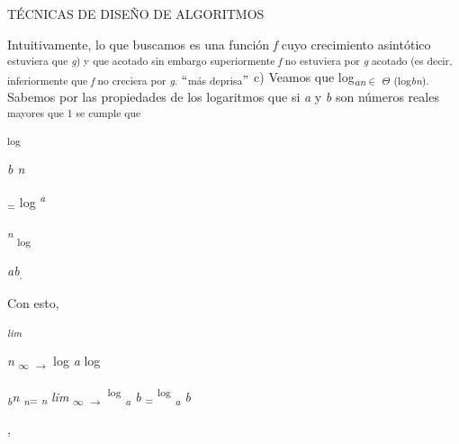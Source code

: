 \documentclass[12pt]{article}
\renewcommand{\_}{\kern-1.5pt\textunderscore\kern-1.5pt}
\begin{document}
{\fontsize{10pt}{12.0pt} {\fontsize{7pt}{8.4pt}\selectfont TÉCNICAS DE DISEÑO DE ALGORITMOS \par}\par}\par

\begin{justify}
{\fontsize{10pt}{12.0pt}\selectfont Intuitivamente, lo que buscamos es una función \textit{f }cuyo crecimiento asintótico \textsubscript{estuviera que \textit{g}) y que acotado sin embargo superiormente \textit{f }no estuviera por \textit{g }acotado (es decir, inferiormente que \textit{f }no creciera por \textit{g}. $``$más deprisa$"$  }c) Veamos que log\textit{\textsubscript{an}}\textsubscript{$ \in $ $ \Theta $ (log\textit{bn}). }Sabemos por las propiedades de los logaritmos que si \textit{a }y \textit{b }son números reales \textsubscript{mayores que 1 se cumple que }\par}
\end{justify}\par

\textsubscript{log }{\fontsize{6pt}{7.2pt}\selectfont \textit{b n }\par}\par

\textsubscript{= }log \textit{\textsuperscript{a }}\par

\textit{\textsuperscript{n }}\textsubscript{log }\par

{\fontsize{6pt}{7.2pt}\selectfont \textit{ab}\textsubscript{. }\par}\par

{\fontsize{10pt}{12.0pt}\selectfont Con esto, \par}\par

\textit{\textsubscript{lim }}{\fontsize{6pt}{7.2pt}\selectfont \textit{n }\textsubscript{$\infty$ $ \rightarrow $  }log \textit{a }log \par}\par

\textit{\textsubscript{b}n \textsubscript{n}}\textsubscript{= \textit{n }}\textit{lim }\textsubscript{$\infty$ $ \rightarrow $  }\textsuperscript{log }\textit{\textsubscript{a }b }\textsubscript{= }\textsuperscript{log }\textit{\textsubscript{a }b }{\fontsize{10pt}{12.0pt}\selectfont , \par}\par
\end{document}
